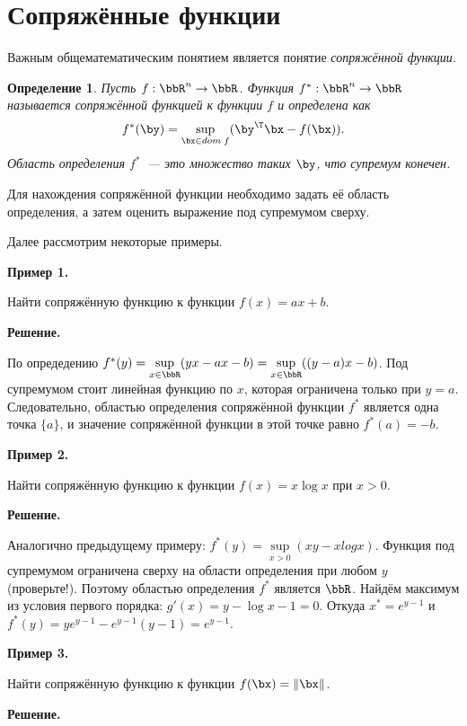 \documentclass[12pt]{article}
\newtheorem{Def}{Определение}
\begin{document}
\section{Сопряжённые функции}
Важным общематематическим понятием является понятие \emph{сопряжённой функции}. 
\begin{Def}
Пусть $f: \bbR^n \rightarrow \bbR$. 
Функция $f^*: \bbR^n \rightarrow \bbR$ называется сопряжённой функцией к функции $f$ и определена как
\vspace{-4mm}
\[
f^*(\by) = \sup\limits_{\bx \in dom \; f} (\by^{\T}\bx - f(\bx)).
\vspace{-3mm}
\]
Область определения $f^*$~--- это множество таких $\by$, что супремум конечен.
\end{Def}
Для нахождения сопряжённой функции необходимо задать её область определения, а затем оценить выражение под супремумом сверху.

Далее рассмотрим некоторые примеры.

\textbf{Пример 1.}

Найти сопряжённую функцию к функции $f(x) = ax + b$.

\textbf{Решение.}

По опредедению $f^*(y) = \sup\limits_{x \in \bbR} (yx - ax - b) = \sup\limits_{x \in \bbR} ((y - a)x - b)$. Под супремумом стоит линейная функцию по $x$, которая ограничена только при $y = a$. 
Следовательно, областью определения сопряжённой функции $f^*$ является одна точка $\{ a\}$, и значение сопряжённой функции в этой точке равно $f^*(a) = -b$.

\textbf{Пример 2.}
   
Найти сопряжённую функцию к функции $f(x) = x\log x$ при $x > 0$.

\textbf{Решение.}

Аналогично предыдущему примеру: $f^*(y) = \sup\limits_{x > 0} (xy - xlog x)$. 
Функция под супремумом ограничена сверху на области определения при любом $y$ (проверьте!). 
Поэтому областью определения $f^*$ является $\bbR$.
Найдём максимум из условия первого порядка: $g'(x) = y - \log x - 1 = 0$.
Откуда $x^* = e^{y - 1}$ и $f^*(y) = ye^{y-1} - e^{y-1}(y-1) = e^{y-1}$.

\textbf{Пример 3.}

Найти сопряжённую функцию к функции $f(\bx) = \|\bx\|$.

\textbf{Решение.}
\end{document}

